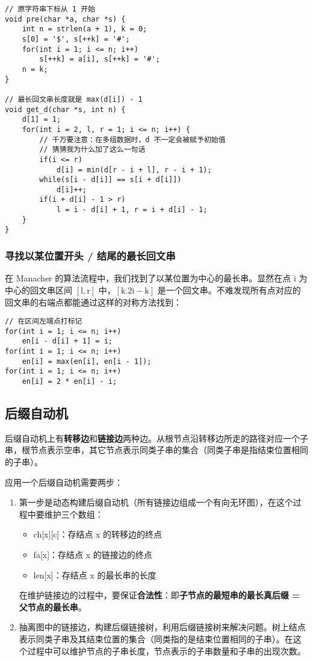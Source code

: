 \documentclass[UTF8]{article}
\begin{document}
\begin{lstlisting}[caption=Manacher]
// 原字符串下标从 1 开始
void pre(char *a, char *s) {
	int n = strlen(a + 1), k = 0;
	s[0] = '$', s[++k] = '#';
	for(int i = 1; i <= n; i++)
		s[++k] = a[i], s[++k] = '#';
	n = k;
}

// 最长回文串长度就是 max(d[i]) - 1
void get_d(char *s, int n) {
	d[1] = 1;
	for(int i = 2, l, r = 1; i <= n; i++) {
		// 千万要注意：在多组数据时，d 不一定会被赋予初始值
		// 猜猜我为什么加了这么一句话
		if(i <= r)
			d[i] = min(d[r - i + l], r - i + 1);
		while(s[i - d[i]] == s[i + d[i]])
			d[i]++;
		if(i + d[i] - 1 > r)
			l = i - d[i] + 1, r = i + d[i] - 1;
	}
}
\end{lstlisting}

\subsubsection{寻找以某位置开头 / 结尾的最长回文串}
在 Manacher 的算法流程中，我们找到了以某位置为中心的最长串。显然在点 $\mathrm{i}$ 为中心的回文串区间 $\mathrm{[l, r]}$ 中，$\mathrm{[k. 2i - k]}$ 是一个回文串。不难发现所有点对应的回文串的右端点都能通过这样的对称方法找到：

\begin{lstlisting}[caption=寻找以某位置开头的最长回文串]
// 在区间左端点打标记
for(int i = 1; i <= n; i++)
	en[i - d[i] + 1] = i;
for(int i = 1; i <= n; i++)
	en[i] = max(en[i], en[i - 1]);
for(int i = 1; i <= n; i++)
	en[i] = 2 * en[i] - i;
\end{lstlisting}


\subsection{后缀自动机}
后缀自动机上有\textbf{转移边}和\textbf{链接边}两种边。从根节点沿转移边所走的路径对应一个子串，根节点表示空串，其它节点表示同类子串的集合（同类子串是指结束位置相同的子串）。

应用一个后缀自动机需要两步：

\begin{enumerate}
	\item 第一步是动态构建后缀自动机（所有链接边组成一个有向无环图），在这个过程中要维护三个数组：
		\begin{itemize}
			\item ch[x][c]：存结点 x 的转移边的终点
			\item fa[x]：存结点 x 的链接边的终点
			\item len[x]：存结点 x 的最长串的长度
		\end{itemize}
		在维护链接边的过程中，要保证\textbf{合法性}：即\textbf{子节点的最短串的最长真后缀 = 父节点的最长串}。
	\item 抽离图中的链接边，构建后缀链接树，利用后缀链接树来解决问题。树上结点表示同类子串及其结束位置的集合（同类指的是结束位置相同的子串）。在这个过程中可以维护节点的子串长度，节点表示的子串数量和子串的出现次数。
\end{enumerate}
\end{document}
